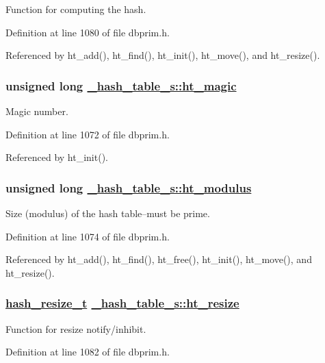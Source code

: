 Function for computing the hash. 

Definition at line 1080 of file dbprim.h.

Referenced by ht\_\-add(), ht\_\-find(), ht\_\-init(), ht\_\-move(), and ht\_\-resize().\hypertarget{struct__hash__table__s_o0}{
\subsubsection[ht\_\-magic]{\setlength{\rightskip}{0pt plus 5cm}unsigned long \hyperlink{struct__hash__table__s_o0}{\_\-hash\_\-table\_\-s::ht\_\-magic}}}
\label{struct__hash__table__s_o0}


Magic number. 

Definition at line 1072 of file dbprim.h.

Referenced by ht\_\-init().\hypertarget{struct__hash__table__s_o2}{
\subsubsection[ht\_\-modulus]{\setlength{\rightskip}{0pt plus 5cm}unsigned long \hyperlink{struct__hash__table__s_o2}{\_\-hash\_\-table\_\-s::ht\_\-modulus}}}
\label{struct__hash__table__s_o2}


Size (modulus) of the hash table--must be prime. 

Definition at line 1074 of file dbprim.h.

Referenced by ht\_\-add(), ht\_\-find(), ht\_\-free(), ht\_\-init(), ht\_\-move(), and ht\_\-resize().\hypertarget{struct__hash__table__s_o9}{
\subsubsection[ht\_\-resize]{\setlength{\rightskip}{0pt plus 5cm}\hyperlink{group__dbprim__hash_ga6}{hash\_\-resize\_\-t} \hyperlink{struct__hash__table__s_o9}{\_\-hash\_\-table\_\-s::ht\_\-resize}}}
\label{struct__hash__table__s_o9}


Function for resize notify/inhibit. 

Definition at line 1082 of file dbprim.h.

